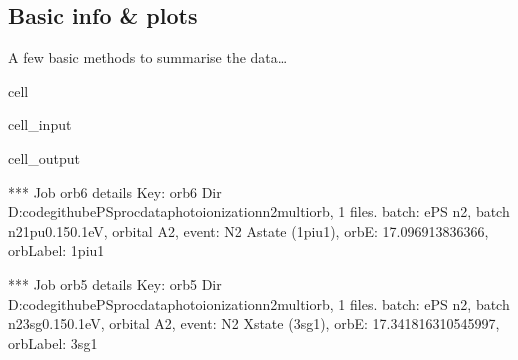 \documentclass[letterpaper,10pt,english]{jupyterBook}
\begin{document}
\subsection{Basic info \& plots}
\label{\detokenize{testChpt/ePSproc_class_demo_161020:basic-info-plots}}
\sphinxAtStartPar
A few basic methods to summarise the data…

\begin{sphinxuseclass}{cell}\begin{sphinxVerbatimInput}

\begin{sphinxuseclass}{cell_input}
\begin{sphinxVerbatim}[commandchars=\\\{\}]
\end{sphinxVerbatim}

\end{sphinxuseclass}\end{sphinxVerbatimInput}
\begin{sphinxVerbatimOutput}

\begin{sphinxuseclass}{cell_output}
\begin{sphinxVerbatim}[commandchars=\\\{\}]
*** Job orb6 details
Key: orb6
Dir D:\PYGZbs{}code\PYGZbs{}github\PYGZbs{}ePSproc\PYGZbs{}data\PYGZbs{}photoionization\PYGZbs{}n2\PYGZus{}multiorb, 1 files.
\PYGZob{}   \PYGZsq{}batch\PYGZsq{}: \PYGZsq{}ePS n2, batch n2\PYGZus{}1pu\PYGZus{}0.1\PYGZhy{}50.1eV, orbital A2\PYGZsq{},
    \PYGZsq{}event\PYGZsq{}: \PYGZsq{} N2 A\PYGZhy{}state (1piu\PYGZhy{}1)\PYGZsq{},
    \PYGZsq{}orbE\PYGZsq{}: \PYGZhy{}17.096913836366,
    \PYGZsq{}orbLabel\PYGZsq{}: \PYGZsq{}1piu\PYGZhy{}1\PYGZsq{}\PYGZcb{}

*** Job orb5 details
Key: orb5
Dir D:\PYGZbs{}code\PYGZbs{}github\PYGZbs{}ePSproc\PYGZbs{}data\PYGZbs{}photoionization\PYGZbs{}n2\PYGZus{}multiorb, 1 files.
\PYGZob{}   \PYGZsq{}batch\PYGZsq{}: \PYGZsq{}ePS n2, batch n2\PYGZus{}3sg\PYGZus{}0.1\PYGZhy{}50.1eV, orbital A2\PYGZsq{},
    \PYGZsq{}event\PYGZsq{}: \PYGZsq{} N2 X\PYGZhy{}state (3sg\PYGZhy{}1)\PYGZsq{},
    \PYGZsq{}orbE\PYGZsq{}: \PYGZhy{}17.341816310545997,
    \PYGZsq{}orbLabel\PYGZsq{}: \PYGZsq{}3sg\PYGZhy{}1\PYGZsq{}\PYGZcb{}
\end{sphinxVerbatim}

\end{sphinxuseclass}\end{sphinxVerbatimOutput}

\end{sphinxuseclass}
\end{document}
